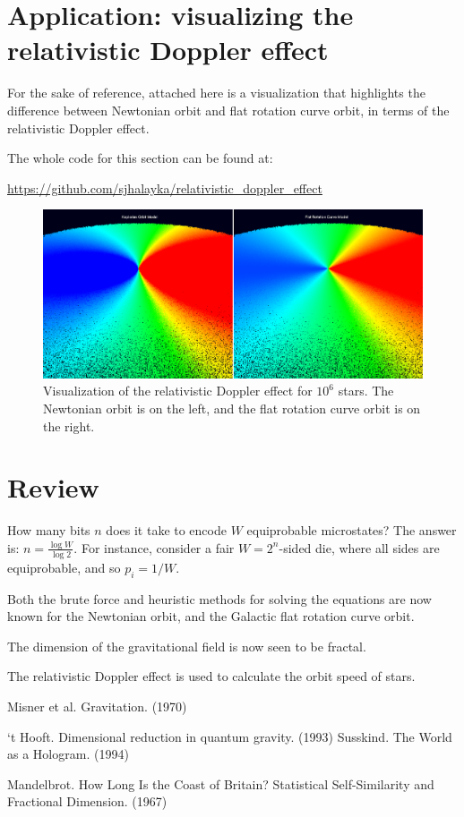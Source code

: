 \documentclass[12pt]{article}
\begin{document}
\section{Application: visualizing the relativistic Doppler effect}
For the sake of reference, attached here is a visualization that highlights the difference between Newtonian orbit and flat rotation curve orbit, in terms of the relativistic Doppler effect.

The whole code for this section can be found at:

\url{https://github.com/sjhalayka/relativistic_doppler_effect}

\begin{figure} 
\centering
\label{fig2}
  \includegraphics[width = 7 in]{doppler.png}
  \caption{
Visualization of the relativistic Doppler effect for $10^6$ stars.
The Newtonian orbit is on the left, and the flat rotation curve orbit is on the right.
}
\end{figure}




\section{Review}

How many bits $n$ does it take to encode $W$ equiprobable microstates?
The answer is: $n = \frac{\log W}{\log 2}$.
For instance, consider a fair $W = 2^n$-sided die, where all sides are equiprobable, and so $p_i = 1/W$.

Both the brute force and heuristic methods for solving the equations are now known for the Newtonian orbit, and the Galactic flat rotation curve orbit.

The dimension of the gravitational field is now seen to be fractal.

The relativistic Doppler effect is used to calculate the orbit speed of stars.



\begin{thebibliography}{9}

 Misner et al. Gravitation. (1970)

 `t Hooft. Dimensional reduction in quantum gravity. (1993)
 Susskind. The World as a Hologram. (1994)

 Mandelbrot. How Long Is the Coast of Britain? Statistical Self-Similarity and Fractional Dimension. (1967)





\end{thebibliography}
\end{document}
